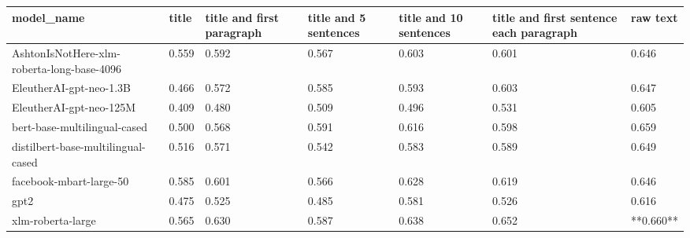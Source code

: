 \begin{tabular}{lllllll}
\toprule
                                model\_name & title & title and first paragraph & title and 5 sentences & title and 10 sentences & title and first sentence each paragraph &  raw text \\
\midrule
AshtonIsNotHere-xlm-roberta-long-base-4096 & 0.559 &                     0.592 &                 0.567 &                  0.603 &                                   0.601 &     0.646 \\
                   EleutherAI-gpt-neo-1.3B & 0.466 &                     0.572 &                 0.585 &                  0.593 &                                   0.603 &     0.647 \\
                   EleutherAI-gpt-neo-125M & 0.409 &                     0.480 &                 0.509 &                  0.496 &                                   0.531 &     0.605 \\
              bert-base-multilingual-cased & 0.500 &                     0.568 &                 0.591 &                  0.616 &                                   0.598 &     0.659 \\
        distilbert-base-multilingual-cased & 0.516 &                     0.571 &                 0.542 &                  0.583 &                                   0.589 &     0.649 \\
                   facebook-mbart-large-50 & 0.585 &                     0.601 &                 0.566 &                  0.628 &                                   0.619 &     0.646 \\
                                      gpt2 & 0.475 &                     0.525 &                 0.485 &                  0.581 &                                   0.526 &     0.616 \\
                         xlm-roberta-large & 0.565 &                     0.630 &                 0.587 &                  0.638 &                                   0.652 & **0.660** \\
\bottomrule
\end{tabular}
